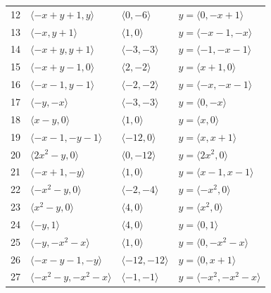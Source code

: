 \documentclass[11pt]{article}
\begin{document}
\begin{longtable}{@{}rlll@{}}
12 & $\langle -x+y+1,y\rangle$ & $\langle 0,-6\rangle$ & $y=\langle 0,-x+1\rangle$\\
13 & $\langle -x,y+1\rangle$ & $\langle 1,0\rangle$ & $y=\langle -x-1,-x\rangle$\\
14 & $\langle -x+y,y+1\rangle$ & $\langle -3,-3\rangle$ & $y=\langle -1,-x-1\rangle$\\
15 & $\langle -x+y-1,0\rangle$ & $\langle 2,-2\rangle$ & $y=\langle x+1,0\rangle$\\
16 & $\langle -x-1,y-1\rangle$ & $\langle -2,-2\rangle$ & $y=\langle -x,-x-1\rangle$\\
17 & $\langle -y,-x\rangle$ & $\langle -3,-3\rangle$ & $y=\langle 0,-x\rangle$\\
18 & $\langle x-y,0\rangle$ & $\langle 1,0\rangle$ & $y=\langle x,0\rangle$\\
19 & $\langle -x-1,-y-1\rangle$ & $\langle -12,0\rangle$ & $y=\langle x,x+1\rangle$\\
20 & $\langle 2x^{2}-y,0\rangle$ & $\langle 0,-12\rangle$ & $y=\langle 2x^{2},0\rangle$\\
21 & $\langle -x+1,-y\rangle$ & $\langle 1,0\rangle$ & $y=\langle x-1,x-1\rangle$\\
22 & $\langle -x^{2}-y,0\rangle$ & $\langle -2,-4\rangle$ & $y=\langle -x^{2},0\rangle$\\
23 & $\langle x^{2}-y,0\rangle$ & $\langle 4,0\rangle$ & $y=\langle x^{2},0\rangle$\\
24 & $\langle -y,1\rangle$ & $\langle 4,0\rangle$ & $y=\langle 0,1\rangle$\\
25 & $\langle -y,-x^{2}-x\rangle$ & $\langle 1,0\rangle$ & $y=\langle 0,-x^{2}-x\rangle$\\
26 & $\langle -x-y-1,-y\rangle$ & $\langle -12,-12\rangle$ & $y=\langle 0,x+1\rangle$\\
27 & $\langle -x^{2}-y,-x^{2}-x\rangle$ & $\langle -1,-1\rangle$ & $y=\langle -x^{2},-x^{2}-x\rangle$\\
\end{longtable}
\endgroup
\end{document}

